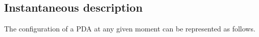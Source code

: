 

\setcounter{section}{6}
\setcounter{subsection}{2}
\setcounter{dfn}{5}

\subsection{Instantaneous description}
The configuration of a PDA at any given moment can be represented as follows.


